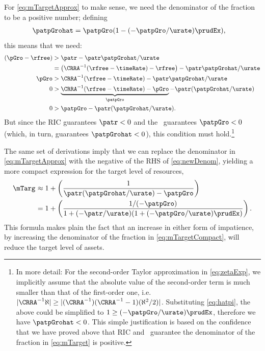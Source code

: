 \documentclass{handout}
\begin{document}
For \eqref{eq:mTargetApprox} to make sense, we need
the denominator of the fraction to be a positive number;
defining
\begin{equation}\begin{gathered}\begin{aligned}
  \patpGrohat & =  \patpGro(1-(-\patpGro/\urate)\prudEx),
\end{aligned}\end{gathered}\end{equation}
this means that we need:
\begin{equation}\begin{gathered}\begin{aligned}
    (\pGro - \rfree) & >  \patr - \patr\patpGrohat/\urate
\\   & =  \left(\CRRA^{-1}(\rfree-\timeRate)-\rfree\right)-  \patr\patpGrohat/\urate
\\ \pGro & >  \CRRA^{-1}(\rfree-\timeRate)-  \patr\patpGrohat/\urate
\\ 0 & >  \underbrace{\CRRA^{-1}(\rfree-\timeRate) - \pGro}_{\patpGro} -  \patr(\patpGrohat/\urate)
\\ 0 & >  \patpGro -  \patr(\patpGrohat/\urate) \label{eq:newDenom}
.
\end{aligned}\end{gathered}\end{equation}
But since the RIC guarantees $\patr<0$ and the \GICPGro~guarantees $\patpGro<0$ (which, in turn, guarantees $\patpGrohat < 0$), this condition must hold.\footnote{In more detail: For the second-order Taylor approximation in \eqref{eq:zetaExp}, we implicitly assume that the absolute value of the second-order term is much smaller than that of the first-order one, i.e. $|\CRRA^{-1} \aleph | \geq |(\CRRA^{-1})(\CRRA^{-1}-1)(\aleph^{2}/2)|$. Substituting \eqref{eq:hatpi}, the above could be simplified to $1 \geq (-\patpGro/\urate)\prudEx$, therefore we have $\patpGrohat < 0$. This simple justification is based on the confidence that we have proved above that RIC and \GICPGro~guarantee the denominator of the fraction in \eqref{eq:mTarget} is positive.}

The same set of derivations imply that we can
replace the denominator in \eqref{eq:mTargetApprox} with the negative
of the RHS of \eqref{eq:newDenom}, yielding a more compact expression
for the target level of resources,
\begin{equation}\begin{gathered}\begin{aligned}
 \mTarg^{\null} & \approx  1 + \left(\frac{1}{\patr(\patpGrohat/\urate) - \patpGro }\right)
\\ & =  1 + \left(\frac{1/(-\patpGro)}{1+(-\patr/\urate)(1+(-\patpGro/\urate)\prudEx)  }\right) \label{eq:mTargetCompact}
.
\end{aligned}\end{gathered}\end{equation}
This formula makes plain the fact that an
increase in either form of impatience, by increasing the denominator of the 
fraction in 
\eqref{eq:mTargetCompact}, will reduce the target level of assets.
\end{document}
